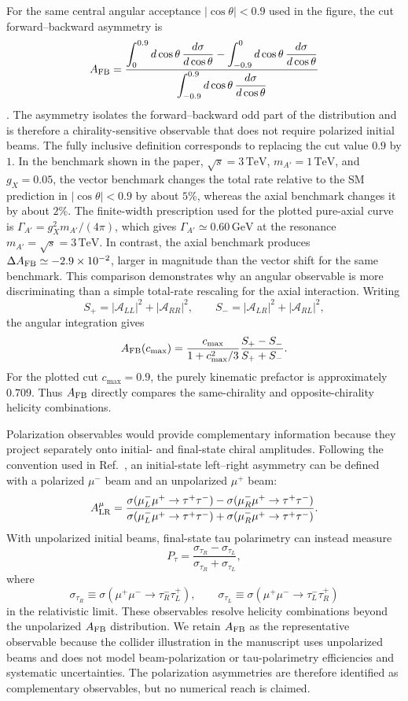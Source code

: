 \documentclass[12pt,a4paper]{article}
\begin{document}
For the same central angular acceptance \(|\cos\theta|<0.9\) used in the figure, the cut forward--backward asymmetry is
\[
A_{\rm FB}
=
\frac{\displaystyle
\int_0^{0.9}d\cos\theta\,\frac{d\sigma}{d\cos\theta}
-
\int_{-0.9}^{0}d\cos\theta\,\frac{d\sigma}{d\cos\theta}}
{\displaystyle
\int_{-0.9}^{0.9}d\cos\theta\,\frac{d\sigma}{d\cos\theta}}
\].
The asymmetry isolates the forward--backward odd part of the distribution and is therefore a chirality-sensitive observable that does not require polarized initial beams. The fully inclusive definition corresponds to replacing the cut value \(0.9\) by \(1\). In the benchmark shown in the paper, \(\sqrt{s}=3\,\mathrm{TeV}\), \(m_{A'}=1\,\mathrm{TeV}\), and \(g_X=0.05\), the vector benchmark changes the total rate relative to the SM prediction in \(|\cos\theta|<0.9\) by about \(5\%\), whereas the axial benchmark changes it by about \(2\%\). The finite-width prescription used for the plotted pure-axial curve is \(\Gamma_{A'}=g_X^2m_{A'}/(4\pi)\), which gives \(\Gamma_{A'}\simeq0.60\,\mathrm{GeV}\) at the resonance \(m_{A'}=\sqrt{s}=3\,\mathrm{TeV}\). In contrast, the axial benchmark produces \(\Delta A_{\rm FB}\simeq-2.9\times10^{-2}\), larger in magnitude than the vector shift for the same benchmark. This comparison demonstrates why an angular observable is more discriminating than a simple total-rate rescaling for the axial interaction.
Writing
\[
S_+=|\mathcal A_{LL}|^2+|\mathcal A_{RR}|^2,\qquad
S_-=|\mathcal A_{LR}|^2+|\mathcal A_{RL}|^2,
\]
the angular integration gives
\[
A_{\rm FB}(c_{\max})
=
\frac{c_{\max}}{1+c_{\max}^2/3}
\frac{S_+-S_-}{S_++S_-}.
\]
For the plotted cut \(c_{\max}=0.9\), the purely kinematic prefactor is approximately \(0.709\). Thus \(A_{\rm FB}\) directly compares the same-chirality and opposite-chirality helicity combinations.

Polarization observables would provide complementary information because they project separately onto initial- and final-state chiral amplitudes. Following the convention used in Ref.~\cite{Huang:2021nkl}, an initial-state left--right asymmetry can be defined with a polarized \(\mu^-\) beam and an unpolarized \(\mu^+\) beam:
\[
A_{\rm LR}^{\mu}
=
\frac{\sigma(\mu^-_L\mu^+\to\tau^+\tau^-)-\sigma(\mu^-_R\mu^+\to\tau^+\tau^-)}
{\sigma(\mu^-_L\mu^+\to\tau^+\tau^-)+\sigma(\mu^-_R\mu^+\to\tau^+\tau^-)}.
\]
With unpolarized initial beams, final-state tau polarimetry can instead measure
\[
P_\tau
=
\frac{\sigma_{\tau_R}-\sigma_{\tau_L}}
{\sigma_{\tau_R}+\sigma_{\tau_L}},
\]
where
\[
\sigma_{\tau_R}\equiv\sigma(\mu^+\mu^-\to\tau^-_R\tau^+_L),\qquad
\sigma_{\tau_L}\equiv\sigma(\mu^+\mu^-\to\tau^-_L\tau^+_R)
\]
in the relativistic limit. These observables resolve helicity combinations beyond the unpolarized \(A_{\rm FB}\) distribution. We retain \(A_{\rm FB}\) as the representative observable because the collider illustration in the manuscript uses unpolarized beams and does not model beam-polarization or tau-polarimetry efficiencies and systematic uncertainties. The polarization asymmetries are therefore identified as complementary observables, but no numerical reach is claimed.
\end{document}
